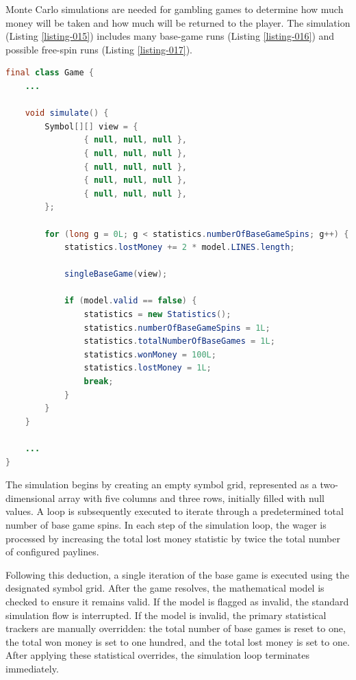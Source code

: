 \documentclass[12pt,twoside,openany]{book}
\begin{document}
Monte Carlo simulations are needed for gambling games to determine how much money will be taken and how much will be returned to the player. The simulation (Listing \ref{listing-015}) includes many base-game runs (Listing \ref{listing-016}) and possible free-spin runs (Listing \ref{listing-017}).

\begin{lstlisting}[language=Java, caption={Simulation loop}, label=listing-015]
final class Game {
	...

	void simulate() {
		Symbol[][] view = {
				{ null, null, null },
				{ null, null, null },
				{ null, null, null },
				{ null, null, null },
				{ null, null, null },
		};

		for (long g = 0L; g < statistics.numberOfBaseGameSpins; g++) {
			statistics.lostMoney += 2 * model.LINES.length;

			singleBaseGame(view);

			if (model.valid == false) {
				statistics = new Statistics();
				statistics.numberOfBaseGameSpins = 1L;
				statistics.totalNumberOfBaseGames = 1L;
				statistics.wonMoney = 100L;
				statistics.lostMoney = 1L;
				break;
			}
		}
	}

	...
}
\end{lstlisting}

The simulation begins by creating an empty symbol grid, represented as a two-dimensional array with five columns and three rows, initially filled with null values. A loop is subsequently executed to iterate through a predetermined total number of base game spins. In each step of the simulation loop, the wager is processed by increasing the total lost money statistic by twice the total number of configured paylines.

Following this deduction, a single iteration of the base game is executed using the designated symbol grid. After the game resolves, the mathematical model is checked to ensure it remains valid. If the model is flagged as invalid, the standard simulation flow is interrupted. If the model is invalid, the primary statistical trackers are manually overridden: the total number of base games is reset to one, the total won money is set to one hundred, and the total lost money is set to one. After applying these statistical overrides, the simulation loop terminates immediately.
\end{document}

